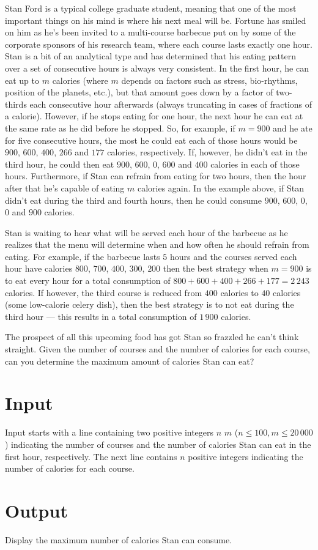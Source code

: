 Stan Ford is a typical college graduate student, meaning that one of the most
important things on his mind is where his next meal will be.  Fortune has smiled
on him as he's been invited to a multi-course barbecue put on by some of the
corporate sponsors of his research team, where each course lasts exactly one
hour.  Stan is a bit of an analytical type and has determined that his eating
pattern over a set of consecutive hours is always very consistent.  In the first
hour, he can eat up to $m$ calories (where $m$ depends on factors such as
stress, bio-rhythms, position of the planets, etc.), but that amount goes down by
a factor of two-thirds each consecutive hour afterwards (always truncating in
cases of fractions of a calorie). However, if he stops eating for one hour,
the next hour he can eat at the same rate as he did before he stopped.  So,
for example, if $m=900$ and he ate for five consecutive hours, the most he could
eat each of those hours would be $900$, $600$, $400$, $266$ and $177$ calories,
respectively. If, however, he didn't eat in the third hour, he could then eat
$900$, $600$, $0$, $600$ and $400$ calories in each of those hours.  Furthermore, if Stan
can refrain from eating for two hours, then the hour after that he's capable of
eating $m$ calories again.  In the example above, if Stan didn't eat during
the third and fourth hours, then he could consume $900$, $600$, $0$, $0$ and $900$
calories.

Stan is waiting to hear what will be served each hour of the barbecue as he
realizes that the menu will determine when and how often he should refrain from
eating.  For example, if the barbecue lasts $5$ hours and the courses served
each hour have calories $800$, $700$, $400$, $300$, $200$ then the best strategy when
$m=900$ is to eat every hour for a total consumption of $800+600+400+266+177 =
2\,243$ calories. If however, the third course is reduced from $400$ calories to $40$
calories (some low-calorie celery dish), then the best strategy is to not eat
during the third hour --- this results in a total consumption of $1\,900$ calories.

The prospect of all this upcoming food has got Stan so frazzled he can't think
straight.  Given the number of courses and the number of calories for each
course, can you determine the maximum amount of calories Stan can eat?

\section*{Input}
Input starts with a line containing two positive integers $n$ $m$
($n \leq 100, m \leq 20\,000$) indicating the number of courses and the number of
calories Stan can eat in the first hour, respectively.  The next line contains
$n$ positive integers indicating the number of calories for each course.

\section*{Output}
Display the maximum number of calories Stan can consume.

